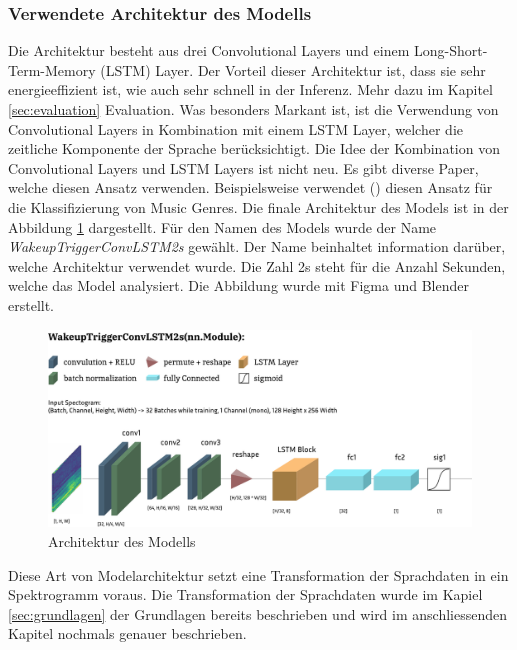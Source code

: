 \documentclass[11pt,a4paper]{article}
\begin{document}
\subsubsection{Verwendete Architektur des Modells}
Die Architektur besteht aus drei Convolutional Layers und einem Long-Short-Term-Memory 
(LSTM) Layer. Der Vorteil dieser Architektur ist, dass sie sehr energieeffizient ist, wie auch sehr 
schnell in der Inferenz. Mehr dazu im Kapitel \ref{sec:evaluation} Evaluation. Was besonders Markant 
ist, ist die Verwendung von Convolutional Layers in Kombination mit einem LSTM Layer, welcher die 
zeitliche Komponente der Sprache berücksichtigt. Die Idee der Kombination von Convolutional Layers 
und LSTM Layers ist nicht neu. Es gibt diverse Paper, welche diesen Ansatz verwenden. 
Beispielsweise verwendet (\cite{khamees2021classifying}) diesen Ansatz für die Klassifizierung von 
Music Genres. Die finale Architektur des Models ist in der Abbildung \ref{fig:model_architecture} 
dargestellt. Für den Namen des Models wurde der Name \textit{WakeupTriggerConvLSTM2s} gewählt. Der 
Name beinhaltet information darüber, welche Architektur verwendet wurde. Die Zahl 2s steht für die 
Anzahl Sekunden, welche das Model analysiert. Die Abbildung wurde mit Figma und Blender erstellt.

\begin{figure}[h]
	\centering
	\includegraphics[width=1.0\linewidth]{img/model_architecture.pdf}
	\caption{Architektur des Modells}
	\label{fig:model_architecture}
\end{figure}

\noindent \newline
Diese Art von Modelarchitektur setzt eine Transformation der Sprachdaten in ein Spektrogramm voraus.
Die Transformation der Sprachdaten wurde im Kapiel \ref{sec:grundlagen} der Grundlagen bereits
beschrieben und wird im anschliessenden Kapitel nochmals genauer beschrieben.
\end{document}
